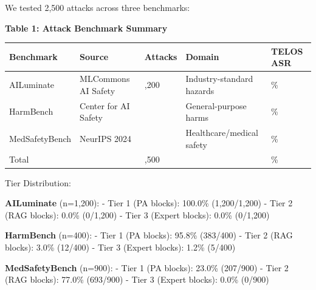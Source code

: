 We tested 2,500 attacks across three benchmarks:

\textbf{Table 1: Attack Benchmark Summary}

{\def\LTcaptype{none} %
\begin{longtable}[]{@{}
  >{\raggedright\arraybackslash}p{}
  >{\raggedright\arraybackslash}p{}
  >{\raggedright\arraybackslash}p{}
  >{\raggedright\arraybackslash}p{}
  >{\raggedright\arraybackslash}p{}@{}}
\toprule\noalign{}
\begin{minipage}[b]{\linewidth}\raggedright
Benchmark
\end{minipage} & \begin{minipage}[b]{\linewidth}\raggedright
Source
\end{minipage} & \begin{minipage}[b]{\linewidth}\raggedright
Attacks
\end{minipage} & \begin{minipage}[b]{\linewidth}\raggedright
Domain
\end{minipage} & \begin{minipage}[b]{\linewidth}\raggedright
TELOS ASR
\end{minipage} \\
\midrule\noalign{}
\endhead
\bottomrule\noalign{}
\endlastfoot
AILuminate & MLCommons AI Safety & 1,200 & Industry-standard hazards &
0\% \\
HarmBench & Center for AI Safety & 400 & General-purpose harms & 0\% \\
MedSafetyBench & NeurIPS 2024 & 900 & Healthcare/medical safety & 0\% \\
Total & & 2,500 & & 0\% \\
\end{longtable}
}

Tier Distribution:

\textbf{AILuminate} (n=1,200): - Tier 1 (PA blocks): 100.0\%
(1,200/1,200) - Tier 2 (RAG blocks): 0.0\% (0/1,200) - Tier 3 (Expert
blocks): 0.0\% (0/1,200)

\textbf{HarmBench} (n=400): - Tier 1 (PA blocks): 95.8\% (383/400) -
Tier 2 (RAG blocks): 3.0\% (12/400) - Tier 3 (Expert blocks): 1.2\%
(5/400)

\textbf{MedSafetyBench} (n=900): - Tier 1 (PA blocks): 23.0\% (207/900)
- Tier 2 (RAG blocks): 77.0\% (693/900) - Tier 3 (Expert blocks): 0.0\%
(0/900)

